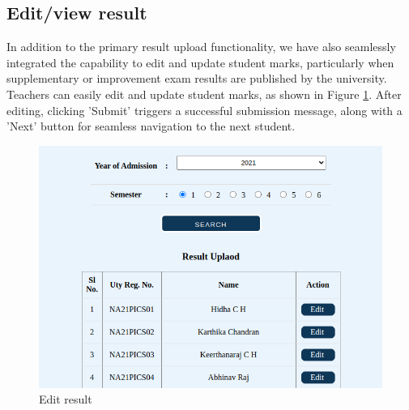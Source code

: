 \documentclass{nascproject}
\begin{document}
\subsection{Edit/view result}
In addition to the primary result upload functionality, we have also seamlessly integrated the capability to edit and update student marks, particularly when supplementary or improvement exam results are published by the university. Teachers can easily edit and update student marks, as shown in Figure \ref{edit}. After editing, clicking 'Submit' triggers a successful submission message, along with a 'Next' button for seamless navigation to the next student.

 \begin{figure}[H]
	\centering
	\includegraphics[scale=0.5]{edit.png}
	\caption{Edit result}
	\label{edit}
\end{figure}
\end{document}
